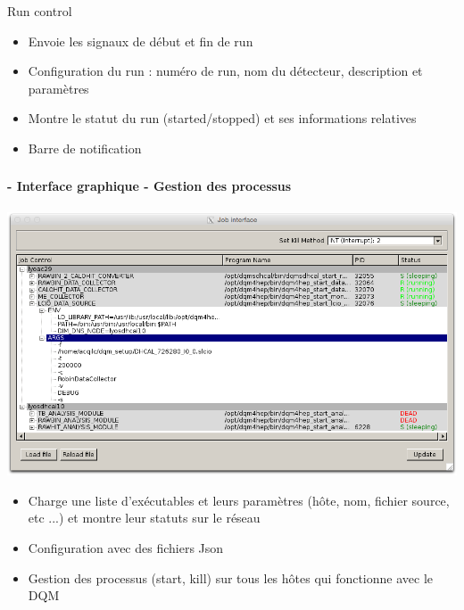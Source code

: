 \documentclass[8pt]{beamer}
\begin{document}
\begin{frame}
\begin{minipage}{0.3\linewidth}
    \end{minipage} \hfill
    \begin{minipage}{0.6\linewidth}
      \begin{block}{Run control}
        \begin{itemize}
          \item Envoie les signaux de début et fin de run
          \item Configuration du run : numéro de run, nom du détecteur, description et paramètres
          \item Montre le statut du run (started/stopped) et ses informations relatives
          \item Barre de notification
        \end{itemize}
      \end{block}
    \end{minipage}
  \end{frame}
  

  \begin{frame}
  \frametitle{\secname}
  \framesubtitle{\subsecname - Interface graphique - Gestion des processus}
    \includegraphics[width=\linewidth]{JobInterface.png} \\
    \begin{itemize}
      \item Charge une liste d’exécutables et leurs paramètres (hôte, nom, fichier source, etc ...) et montre leur statuts sur le réseau
      \item Configuration avec des fichiers Json
      \item Gestion des processus (start, kill) sur tous les hôtes qui fonctionne avec le DQM
    \end{itemize}
  \end{frame}
  
\end{document}
